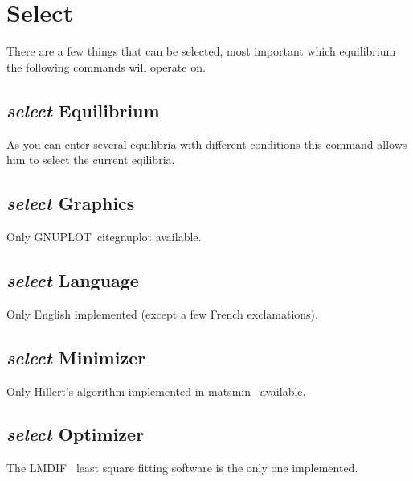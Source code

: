 \documentclass[11pt]{article}
\begin{document}
\hypertarget{Select}{}
\section{Select }

There are a few things that can be selected, most important which
equilibrium the following commands will operate on.

\hypertarget{Select equilibrium}{}
\subsection{{\em select} Equilibrium}

As you can enter several equilibria with different conditions
this command allows him to select the current eqilibria.

\hypertarget{Select graphics}{}
\subsection{{\em select} Graphics}

Only GNUPLOT~cite{gnuplot} available.

\hypertarget{Select language}{}
\subsection{{\em select} Language}

Only English implemented (except a few French exclamations).

\hypertarget{Select minimizer}{}
\subsection{{\em select} Minimizer}

Only Hillert's algorithm implemented in matsmin~\cite{15Sun2} available.

\hypertarget{Select optimizer}{}
\subsection{{\em select} Optimizer}

The LMDIF~\cite{lmdif} least square fitting software is the only one
implemented.

\end{document}
